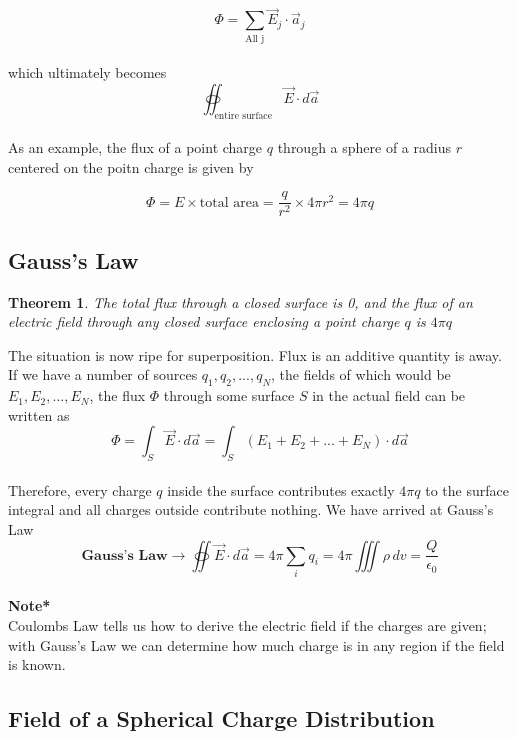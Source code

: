 \documentclass[svgnames]{article}
\newtheorem{theorem}{Theorem}		%
\begin{document}
\[ \Phi = \sum_{\text{All j}} \vec{E}_j \cdot \vec{a}_j \] \\

which ultimately becomes \\ 

\[ \oiint_\text{entire surface} \vec{E} \cdot d\vec{a} \] \\ 

As an example, the flux of a point charge $q$ through a sphere of a radius $r$ centered on the poitn charge is given by

\[ \Phi = E \times \text{total area} = \frac{q}{r^2} \times 4\pi r^2 = 4\pi q \] 

\subsection{Gauss's Law} 

\begin{theorem}
The total flux through a closed surface is 0, and the flux of an electric field through \textit{any} closed surface enclosing a point charge $q$ is $4\pi q$ 
\end{theorem} 

The situation is now ripe for superposition. Flux is an additive quantity is away. If we have a number of sources $q_1,q_2,...,q_N$, the fields of which would be $E_1,E_2,...,E_N$, the flux $\Phi$ through some surface $S$ in the actual field can be written as \\

\[ \Phi = \int_S \vec{E} \cdot d\vec{a} = \int_S (E_1 + E_2 + ... + E_N) \cdot d\vec{a} \] \\

Therefore, every charge $q$ inside the surface contributes exactly $4\pi q$ to the surface integral and all charges outside contribute nothing. We have arrived at Gauss's Law \\ 

\[ \textbf{Gauss's Law} \rightarrow  \oiint \vec{E} \cdot d\vec{a} = 4\pi \sum_i q_i = 4\pi \iiint \rho \, dv =  \frac{Q}{\epsilon_0} \] \\ 


\textbf{Note*} \\

Coulombs Law tells us how to derive the electric field if the charges are given; with Gauss's Law we can determine how much charge is in any region if the field is known. 

\subsection{Field of a Spherical Charge Distribution} 
\end{document}
